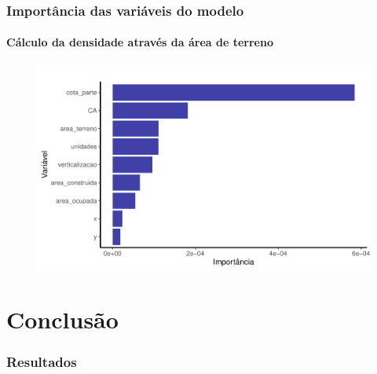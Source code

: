 \documentclass[%
    9pt, 
    aspectratio=169,
]{beamer}
\begin{document}
\begin{frame}
    \frametitle{Importância das variáveis do modelo}
    \framesubtitle{Cálculo da densidade através da área de terreno}
    \begin{figure}
        \includegraphics[width = .8\textwidth]{imagens/var_importance_densmod.pdf}
    \end{figure}
\end{frame}


\section{Conclusão}

\begin{frame}
    \frametitle{Resultados}
\end{frame}

\end{document}
